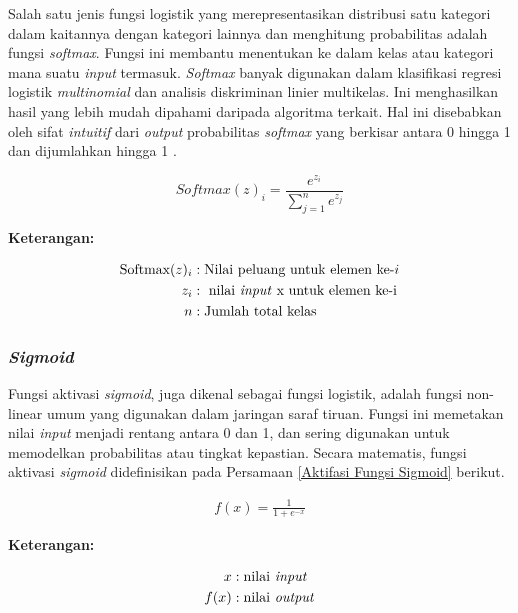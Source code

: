    Salah satu jenis fungsi logistik yang merepresentasikan distribusi satu kategori dalam kaitannya dengan kategori lainnya dan menghitung probabilitas adalah fungsi \textit{softmax}. Fungsi ini membantu menentukan ke dalam kelas atau kategori mana suatu \textit{input} termasuk. \textit{Softmax} banyak digunakan dalam klasifikasi regresi logistik \textit{multinomial} dan analisis diskriminan linier multikelas. Ini menghasilkan hasil yang lebih mudah dipahami daripada algoritma terkait. Hal ini disebabkan oleh sifat \textit{intuitif} dari \textit{output} probabilitas \textit{softmax }yang berkisar antara 0 hingga 1 dan dijumlahkan hingga 1 \cite{Zhang2019}.

        \begin{equation}
            Softmax(z)_i= \frac{e^{z_i}}{\sum_{j=1}^{n} e^{z_j}}
        \end{equation}

     \textbf{Keterangan:}
        

        \begin{align*}
            \text{Softmax}(z)_i &: \text{Nilai peluang untuk elemen ke-}i \\
            z_i &: \text{ nilai \textit{input} x untuk elemen ke-i} \\
            n &: \text{Jumlah total kelas}
        \end{align*}
        



\subsubsection{\textit{Sigmoid}}
    Fungsi aktivasi \textit{sigmoid}, juga dikenal sebagai fungsi logistik, adalah fungsi non-linear umum yang digunakan dalam jaringan saraf tiruan. Fungsi ini memetakan nilai \textit{input} menjadi rentang antara 0 dan 1, dan sering digunakan untuk memodelkan probabilitas atau tingkat kepastian. Secara matematis, fungsi aktivasi \textit{sigmoid} didefinisikan pada Persamaan  \ref{Aktifasi Fungsi Sigmoid} berikut.

    \begin{equation}
        \begin{aligned}
            f(x) = \frac{1}{1 + e^{-x}}
        \end{aligned}\label{Aktifasi Fungsi Sigmoid}
    \end{equation}

     \textbf{Keterangan:}
     
        \begin{align*}
        x & : \text{nilai \textit{input}} \\
        f(x) & :\text{nilai \textit{output}} 
        \end{align*}

